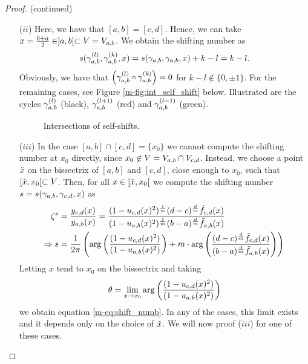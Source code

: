 \documentclass[main.tex]{subfiles}
\begin{document}
   \begin{proof}(continued)
   \begin{itemize}
    \item[($ii$)] Here, we have that $[a,b] = [c,d]$. Hence, we can take $x = \frac{b+a}{2} \in  ]a,b[  \subset V = V_{a,b}$. We obtain the shifting number as
    \begin{align*}
      s(\gamma_{a,b}^{(l)},\gamma_{a,b}^{(k)},x) = s(\gamma_{a,b},\gamma_{a,b},x) + k - l = k - l.
    \end{align*}
    Obviously, we have that $\left(\gamma_{a,b}^{(l)} \circ \gamma_{a,b}^{(k)}\right) = 0$ for $k - l \not\in \{ 0, \pm 1\}$. For the remaining cases, see Figure \ref{m-fig:int_self_shift} below.
    Illustrated are the cycles $\gamma_{a,b}^{(l)}$ (black),
      $\gamma_{a,b}^{(l+1)}$ (red) and $\gamma_{a,b}^{(l-1)}$ (green).
    \begin{figure}[H]
      \begin{center}
   
      \end{center}
    \caption{Intersections of self-shifts.}
    \label{fig:int_self_shift}
\end{figure}
   \item[($iii$)]
  In the case $[a,b] \cap [c,d] = \{ x_0 \}$ we cannot compute the shifting number at $x_0$ directly, since $x_0 \not\in V = V_{a,b} \cap V_{c,d}$. Instead, we choose a point $\tilde{x}$ on the bissectrix of
  $[a,b]$ and $[c,d]$, close enough to $x_0$, such that $[\tilde{x},x_0[  \subset  V$. Then, for all $x \in [\tilde{x},x_0[$ we compute the shifting number $s = s(\gamma_{a,b},\gamma_{c,d},x)$ as
  \begin{align}
   \zeta^s & = \frac{y_{c,d}(x)}{y_{a,b}(x)} = \frac{(1- u_{c,d}(x)^2)^{\frac{1}{m}} (d-c)^{\frac{d}{m}}\tilde{f}_{c,d}(x) }{(1-u_{a,b}(x)^2)^{\frac{1}{m}} (b-a)^{\frac{d}{m}}\tilde{f}_{a,b}(x)} \\
   \Rightarrow  s & = \frac{1}{2\pi} \left( \arg \left( \frac{(1- u_{c,d}(x)^2)}{(1-u_{a,b}(x)^2)} \right) + m \cdot \arg \left( \frac{(d-c)^{\frac{d}{m}} \tilde{f}_{c,d}(x)}{(b-a)^{\frac{d}{m}}
   \tilde{f}_{a,b}(x)} \right) \right)
  \end{align}
  Letting $x$ tend to $x_0$ on the bissectrix and taking
  \begin{align}
   \theta = \lim_{x \rightarrow x_0} \arg \left( \frac{(1- u_{c,d}(x)^2)}{(1-u_{a,b}(x)^2)} \right)
  \end{align}
  we obtain equation \eqref{m-eq:shift_numb}. In any of the cases, this limit exists and it depends only on the choice of $\tilde{x}$. We will now proof ($iii$) for one of these cases.



\end{itemize}
\end{proof}
\end{document}
